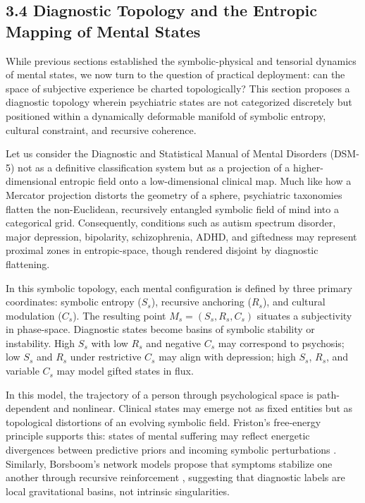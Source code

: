 \subsection*{3.4 Diagnostic Topology and the Entropic Mapping of Mental States}

While previous sections established the symbolic-physical and tensorial dynamics of mental states, we now turn to the question of practical deployment: can the space of subjective experience be charted topologically? This section proposes a diagnostic topology wherein psychiatric states are not categorized discretely but positioned within a dynamically deformable manifold of symbolic entropy, cultural constraint, and recursive coherence.

Let us consider the Diagnostic and Statistical Manual of Mental Disorders (DSM-5) not as a definitive classification system but as a projection of a higher-dimensional entropic field onto a low-dimensional clinical map. Much like how a Mercator projection distorts the geometry of a sphere, psychiatric taxonomies flatten the non-Euclidean, recursively entangled symbolic field of mind into a categorical grid. Consequently, conditions such as autism spectrum disorder, major depression, bipolarity, schizophrenia, ADHD, and giftedness may represent proximal zones in entropic-space, though rendered disjoint by diagnostic flattening.

In this symbolic topology, each mental configuration is defined by three primary coordinates: symbolic entropy (\( S_s \)), recursive anchoring (\( R_s \)), and cultural modulation (\( C_s \)). The resulting point \( M_s = (S_s, R_s, C_s) \) situates a subjectivity in phase-space. Diagnostic states become basins of symbolic stability or instability. High \( S_s \) with low \( R_s \) and negative \( C_s \) may correspond to psychosis; low \( S_s \) and \( R_s \) under restrictive \( C_s \) may align with depression; high \( S_s \), \( R_s \), and variable \( C_s \) may model gifted states in flux.

In this model, the trajectory of a person through psychological space is path-dependent and nonlinear. Clinical states may emerge not as fixed entities but as topological distortions of an evolving symbolic field. Friston's free-energy principle supports this: states of mental suffering may reflect energetic divergences between predictive priors and incoming symbolic perturbations \cite{friston2010}. Similarly, Borsboom's network models propose that symptoms stabilize one another through recursive reinforcement \cite{borsboom2017}, suggesting that diagnostic labels are local gravitational basins, not intrinsic singularities.

